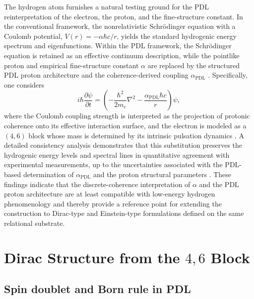 \documentclass[11pt,a4paper]{article}
\theoremstyle{definition}
\newcommand{\alphaPDL}{\alpha_{\mathrm{PDL}}}
\begin{document}
The hydrogen atom furnishes a natural testing ground for the PDL reinterpretation of the electron, the proton, and the fine-structure constant. In the conventional framework, the nonrelativistic Schrödinger equation with a Coulomb potential, $V(r) = -\alpha \hbar c / r$, yields the standard hydrogenic energy spectrum and eigenfunctions. Within the PDL framework, the Schrödinger equation is retained as an effective continuum description, while the pointlike proton and empirical fine-structure constant $\alpha$ are replaced by the structured PDL proton architecture and the coherence-derived coupling $\alphaPDL$ \cite{Schodinger_PDL,Sketch_derivation_Schroedinger_PDL}. Specifically, one considers
\[
i\hbar \frac{\partial \psi}{\partial t} = \left(-\frac{\hbar^2}{2 m_e} \nabla^2 - \frac{\alphaPDL \hbar c}{r}\right)\psi,
\]
where the Coulomb coupling strength is interpreted as the projection of protonic coherence onto its effective interaction surface, and the electron is modeled as a $(4,6)$ block whose mass is determined by its intrinsic pulsation dynamics \cite{PDL,Schodinger_PDL}. A detailed consistency analysis demonstrates that this substitution preserves the hydrogenic energy levels and spectral lines in quantitative agreement with experimental measurements, up to the uncertainties associated with the PDL-based determination of $\alphaPDL$ and the proton structural parameters \cite{Schodinger_PDL,Sketch_derivation_Schroedinger_PDL,PDL_Global_Mapping_Structures_Results_Open_Problems}. These findings indicate that the discrete-coherence interpretation of $\alpha$ and the PDL proton architecture are at least compatible with low-energy hydrogen phenomenology and thereby provide a reference point for extending the construction to Dirac-type and Einstein-type formulations defined on the same relational substrate.

\section{Dirac Structure from the \texorpdfstring{$4,6$}{4,6} Block}\label{sec:Dirac_from_46}

\subsection{Spin doublet and Born rule in PDL}
\end{document}
